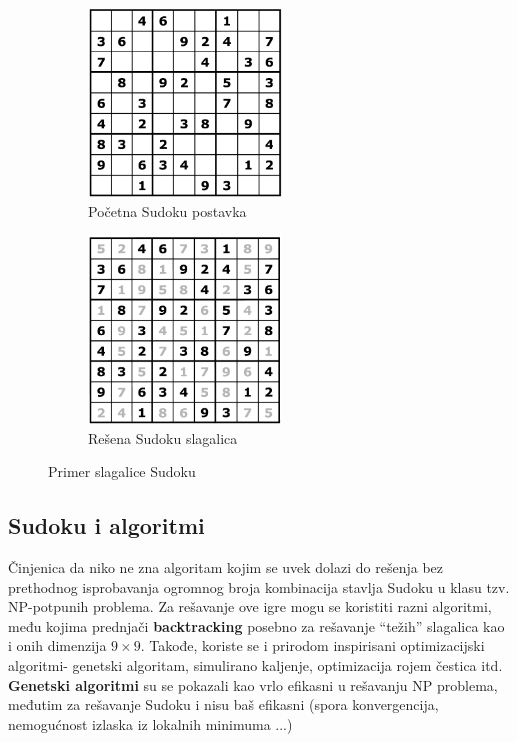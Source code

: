\documentclass[a4paper]{article}
\begin{document}
\begin{figure}[h]

\begin{subfigure}{0.5\textwidth}
\includegraphics[width=0.9\linewidth, height=5cm]{primer_sudoku_neresen.png} 
\caption{Početna Sudoku postavka}
\label{fig:subim1}
\end{subfigure}
\begin{subfigure}{0.5\textwidth}
\includegraphics[width=0.9\linewidth, height=5cm]{primer_sudoku_resen.png}
\caption{Rešena Sudoku slagalica}
\label{fig:subim2}
\end{subfigure}

\caption{Primer slagalice Sudoku}
\label{fig:image2}
\end{figure}

\subsection{Sudoku i algoritmi}
Činjenica da niko ne zna algoritam kojim se uvek dolazi do rešenja bez prethodnog isprobavanja ogromnog broja kombinacija stavlja Sudoku u klasu tzv. NP-potpunih problema. Za rešavanje ove igre mogu se koristiti razni algoritmi, među kojima prednjači \textbf{backtracking} posebno za rešavanje “težih” slagalica kao i onih dimenzija $9\times9$. Takođe, koriste se i prirodom inspirisani optimizacijski algoritmi- genetski algoritam, simulirano kaljenje, optimizacija rojem čestica itd. \textbf{Genetski algoritmi} su se pokazali kao vrlo efikasni u rešavanju NP problema, međutim za rešavanje Sudoku i nisu baš efikasni (spora konvergencija, nemogućnost izlaska iz lokalnih minimuma ...)



\appendix
 

\end{document}
